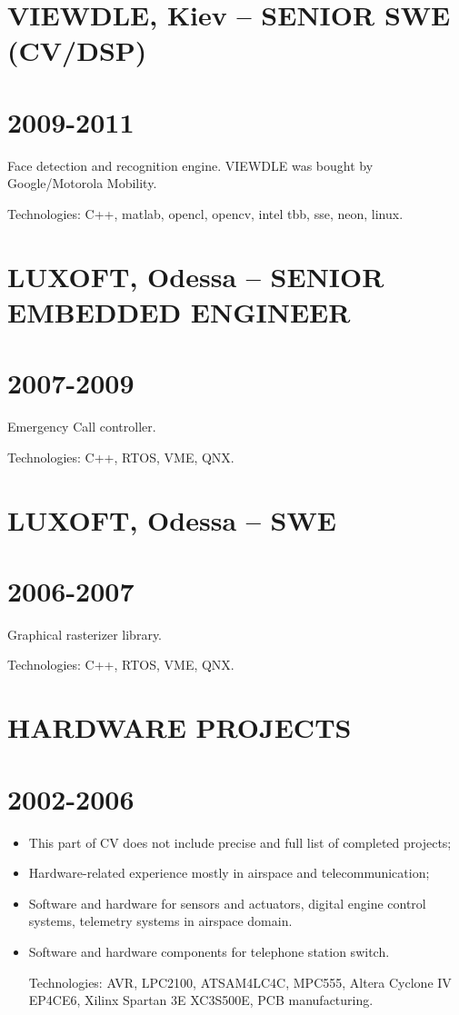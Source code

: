 \documentclass[8pt,a4paper]{article}
\begin{document}
\section*{VIEWDLE, Kiev -- SENIOR SWE (CV/DSP)}
\label{sec:org1ccafff}
\section*{2009-2011}
\label{sec:orga46a4f7}

Face detection and recognition engine. VIEWDLE was bought by
Google/Motorola Mobility.

Technologies: C++, matlab, opencl, opencv, intel tbb, sse, neon, linux.


\section*{LUXOFT, Odessa --  SENIOR EMBEDDED ENGINEER}
\label{sec:org5c2e852}
\section*{2007-2009}
\label{sec:orgbaa0141}

Emergency Call controller.

Technologies: C++, RTOS, VME, QNX.


\section*{LUXOFT, Odessa -- SWE}
\label{sec:org78913d7}
\section*{2006-2007}
\label{sec:orgf9de538}

Graphical rasterizer library.

Technologies: C++, RTOS, VME, QNX.

\section*{HARDWARE PROJECTS}
\label{sec:orgdd46fc1}
\section*{2002-2006}
\label{sec:org6bdc062}

\begin{itemize}
\item This part of CV does not include precise and full list of completed
projects;
\item Hardware-related experience mostly in airspace and
telecommunication;
\item Software and hardware for sensors and actuators, digital engine
control systems, telemetry systems in airspace domain.
\item Software and hardware components for telephone station switch.

Technologies: AVR, LPC2100, ATSAM4LC4C, MPC555, Altera Cyclone IV
EP4CE6, Xilinx Spartan 3E XC3S500E, PCB manufacturing.
\end{itemize}
\end{document}
